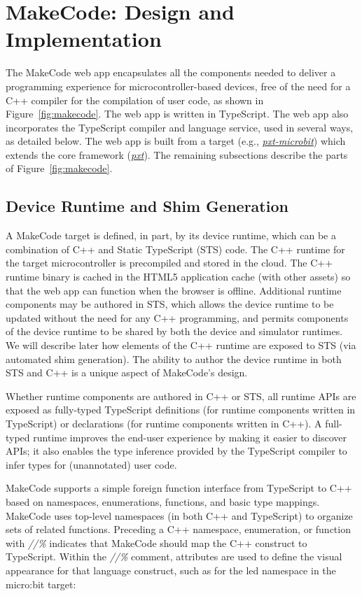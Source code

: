 \section{MakeCode: Design and Implementation}
\label{sec:makecode}

The MakeCode web app encapsulates all the components needed to deliver a programming experience 
for microcontroller-based devices, free of the need for a C++ compiler for the compilation of user 
code, as shown in Figure~\ref{fig:makecode}. 
The web app is written in TypeScript. The web app also incorporates the TypeScript compiler and 
language service, used in several ways, as detailed below. 
The web app is built from a target (e.g., \emph{\href{https://github.com/microsoft/pxt-microbit}{pxt-microbit}})
which extends the core framework (\emph{\href{https://github.com/microsoft/pxt}{pxt}}).
The remaining subsections describe the parts of Figure~\ref{fig:makecode}.

\subsection{Device Runtime and Shim Generation}

A MakeCode target is defined, in part, by its device runtime, which can be a combination of C++ 
and Static TypeScript (STS) code. The C++ runtime for the target microcontroller is precompiled 
and stored in the cloud. The C++ runtime binary is cached in the HTML5 application cache (with 
other assets) so that the web app can function when the browser is offline. Additional runtime
components may be authored in STS, which allows the device runtime to be updated without the need
for any C++ programming, and permits components of the device runtime to be shared by both the device
and simulator runtimes.  We will describe later how elements of the C++ runtime are exposed to STS
(via automated shim generation). The ability to author the device runtime in both STS and C++ is
a unique aspect of MakeCode's design.

Whether runtime components are authored in C++ or STS, all runtime APIs are exposed as fully-typed
TypeScript definitions (for runtime components written in TypeScript) or declarations (for runtime
components written in C++). A full-typed runtime improves the end-user experience by making it easier
to discover APIs; it also enables the type inference provided by the TypeScript compiler to infer types
for (unannotated) user code.

MakeCode supports a simple foreign function interface from TypeScript to C++ based on namespaces,
enumerations, functions, and basic type mappings. MakeCode uses top-level namespaces (in both C++ and
TypeScript) to organize sets of related functions.  Preceding a C++ namespace, enumeration, or function
with \emph{//\%} indicates that MakeCode should map the C++ construct to TypeScript.
Within the \emph{//\%} comment, attributes are used to define the visual appearance for that
language construct, such as for the led namespace in the micro:bit target:

